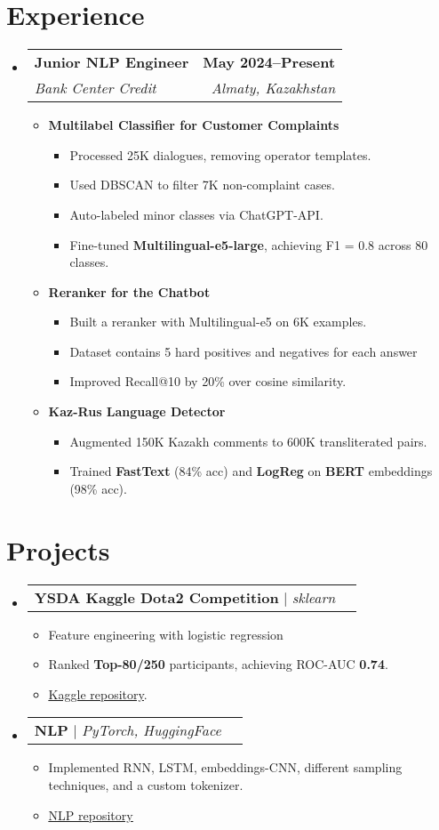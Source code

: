 \documentclass[letterpaper,11pt]{article}
\makeatletter
\newcommand{\resumeItem}[1]{
  \item\small{
    {#1 \vspace{-2pt}}
  }
}
\newcommand{\resumeSubheading}[4]{
  \vspace{-2pt}\item
    \begin{tabular*}{1.0\textwidth}[t]{l@{\extracolsep{\fill}}r}
      \textbf{#1} & \textbf{\small #2} \\
      \emph{\small#3} & \emph{\small #4} \\
    \end{tabular*}\vspace{-7pt}
}
\newcommand{\resumeProjectHeading}[2]{
    \item
    \begin{tabular*}{1.001\textwidth}{l@{\extracolsep{\fill}}r}
      \small#1 & \textbf{\small #2}\\
    \end{tabular*}\vspace{-7pt}
}
\newcommand{\resumeSubHeadingListStart}{\begin{itemize}[leftmargin=0.0in, label={}]}
\newcommand{\resumeSubHeadingListEnd}{\end{itemize}}
\newcommand{\resumeItemListStart}{\begin{itemize}}
\newcommand{\resumeItemListEnd}{\end{itemize}\vspace{-5pt}}
\makeatother
\begin{document}
\section{Experience}
  \resumeSubHeadingListStart
    \resumeSubheading
      {Junior NLP Engineer}{May 2024--Present}
      {Bank Center Credit}{Almaty, Kazakhstan}
      \resumeItemListStart
        \resumeItem{\textbf{Multilabel Classifier for Customer Complaints}}
            \resumeItemListStart
              \resumeItem{Processed 25K dialogues, removing operator templates.}
              \resumeItem{Used DBSCAN to filter 7K non-complaint cases.}
              \resumeItem{Auto-labeled minor classes via ChatGPT-API.}
              \resumeItem{Fine-tuned \textbf{Multilingual-e5-large}, achieving F1 = 0.8 across 80 classes.}
            \resumeItemListEnd

        \resumeItem{\textbf{Reranker for the Chatbot}}
            \resumeItemListStart
              \resumeItem{Built a reranker with Multilingual-e5 on 6K examples.}
              \resumeItem{Dataset contains 5 hard positives and negatives for each answer}
              \resumeItem{Improved Recall@10 by 20\% over cosine similarity.}
            \resumeItemListEnd

        \resumeItem{\textbf{Kaz-Rus Language Detector}}
            \resumeItemListStart
              \resumeItem{Augmented 150K Kazakh comments to 600K transliterated pairs.}
              \resumeItem{Trained \textbf{FastText} (84\% acc) and \textbf{LogReg} on \textbf{BERT} embeddings (98\% acc).}
            \resumeItemListEnd
      \resumeItemListEnd
  \resumeSubHeadingListEnd

\section{Projects}                
    \resumeSubHeadingListStart
        \resumeProjectHeading
            {\textbf{YSDA Kaggle Dota2 Competition} $|$ \emph{sklearn}}{}
            \resumeItemListStart
                \resumeItem{Feature engineering with logistic regression}
                \resumeItem{Ranked \textbf{Top-80/250} participants, achieving ROC-AUC \textbf{0.74}.}
                \resumeItem{\href{https://github.com/AbylayDalabay/kaggle_dota2_ysda}{\underline{Kaggle repository}}.}
            \resumeItemListEnd  

        \resumeProjectHeading
            {\textbf{NLP} $|$ \emph{PyTorch, HuggingFace}}{}
            \resumeItemListStart
                \resumeItem{Implemented RNN, LSTM, embeddings-CNN, different sampling techniques, and a custom tokenizer.}
                \resumeItem{\href{https://github.com/AbylayDalabay/NLP}{\underline{NLP repository}}}
            \resumeItemListEnd
    \resumeSubHeadingListEnd
\end{document}
